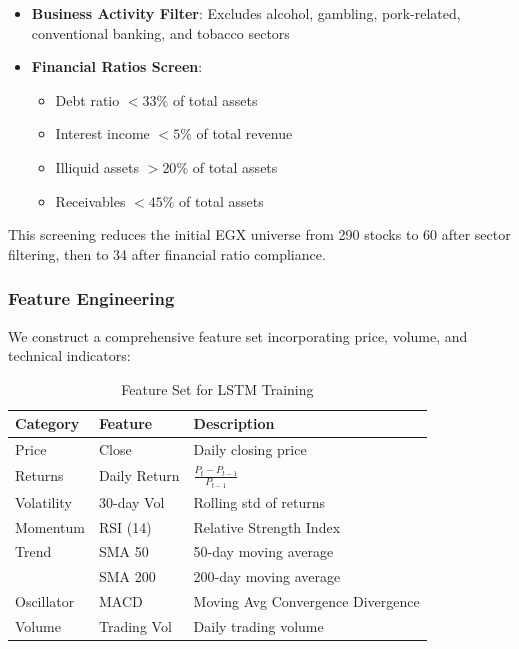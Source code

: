 \documentclass[conference]{IEEEtran}
\begin{document}
\begin{itemize}
\item \textbf{Business Activity Filter}: Excludes alcohol, gambling, pork-related, conventional banking, and tobacco sectors
\item \textbf{Financial Ratios Screen}:
\begin{itemize}
    \item Debt ratio $< 33\%$ of total assets
    \item Interest income $< 5\%$ of total revenue
    \item Illiquid assets $> 20\%$ of total assets
    \item Receivables $< 45\%$ of total assets
\end{itemize}
\end{itemize}

This screening reduces the initial EGX universe from 290 stocks to 60 after sector filtering, then to 34 after financial ratio compliance.

\subsubsection{Feature Engineering}
We construct a comprehensive feature set incorporating price, volume, and technical indicators:

\begin{table}[htbp]
\caption{Feature Set for LSTM Training}
\begin{center}
\begin{tabular}{|l|l|p{4cm}|}
\hline
\textbf{Category} & \textbf{Feature} & \textbf{Description} \\
\hline
Price & Close & Daily closing price \\
\hline
Returns & Daily Return & $\frac{P_t - P_{t-1}}{P_{t-1}}$ \\
\hline
Volatility & 30-day Vol & Rolling std of returns \\
\hline
Momentum & RSI (14) & Relative Strength Index \\
\hline
Trend & SMA 50 & 50-day moving average \\
& SMA 200 & 200-day moving average \\
\hline
Oscillator & MACD & Moving Avg Convergence Divergence \\
\hline
Volume & Trading Vol & Daily trading volume \\
\hline
\end{tabular}
\label{tab:features}
\end{center}
\end{table}
\end{document}
